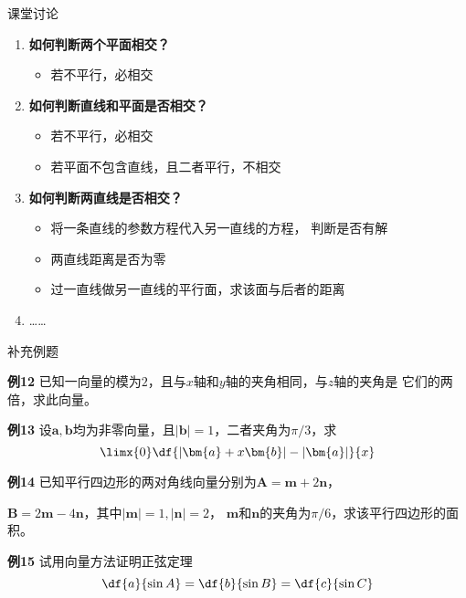 \begin{frame}[<+->]{课堂讨论}
	\linespread{1.2}
	\begin{enumerate}
	  \item {\bf 如何判断两个平面相交？}
	  \begin{itemize}
	    \item \alert{若不平行，必相交}
	  \end{itemize}
	  \item {\bf 如何判断直线和平面是否相交？}
	  \begin{itemize}
	    \item \alert{若不平行，必相交}
	    \item \alert{若平面不包含直线，且二者平行，不相交}
	  \end{itemize}
	  \item {\bf 如何判断两直线是否相交？}
	  \begin{itemize}
	    \item \alert{将一条直线的参数方程代入另一直线的方程，
	    判断是否有解}
	    \item \alert{两直线距离是否为零}
	    \item \alert{过一直线做另一直线的平行面，求该面与后者的距离}
	  \end{itemize}
	  \item \ldots\ldots
	\end{enumerate}
\end{frame}

\begin{frame}{补充例题}
	\linespread{1.2}\pause 
	\begin{exampleblock}{{\bf 例12}\hfill}
		已知一向量的模为$2$，且与$x$轴和$y$轴的夹角相同，与$z$轴的夹角是
		它们的两倍，求此向量。
	\end{exampleblock}
	\bigskip\pause 
	\begin{exampleblock}{{\bf 例13}\hfill}
		设$\bm{a},\bm{b}$均为非零向量，且$|\bm{b}|=1$，二者夹角为$\pi/3$，求
		$$\limx{0}\df{|\bm{a}+x\bm{b}|-|\bm{a}|}{x}$$
	\end{exampleblock}
\end{frame}

\begin{frame}
	\linespread{1.2}
	\begin{exampleblock}{{\bf 例14}\hfill}
		已知平行四边形的两对角线向量分别为$\bm{A}=\bm{m}+2\bm{n}$，
		
		$\bm{B}=2\bm{m}-4\bm{n}$，其中$|\bm{m}|=1,|\bm{n}|=2$，
		$\bm{m}$和$\bm{n}$的夹角为$\pi/6$，求该平行四边形的面积。
	\end{exampleblock}
	\bigskip\pause 
	\begin{exampleblock}{{\bf 例15}\hfill}
		试用向量方法证明正弦定理
		$$\df{a}{\sin A}=\df{b}{\sin B}=\df{c}{\sin C}$$
	\end{exampleblock}
\end{frame}

